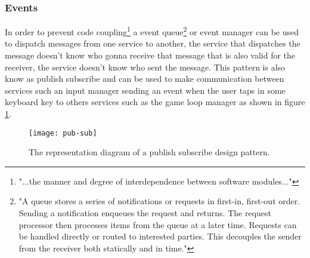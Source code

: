 \subsubsection{Events} \label{sec:events}
In order to prevent code coupling\footnote{"...the manner and degree of interdependence between software modules..."\cite{SystemsAndSoftwareEngineeringVocabulary}} a event queue\footnote{"A queue stores a series of notifications or requests in first-in, first-out order. Sending a notification enqueues the request and returns. The request processor then processes items from the queue at a later time. Requests can be handled directly or routed to interested parties. This decouples the sender from the receiver both statically and in time."\cite{GameProgrammingPatterns}} or event manager can be used to dispatch messages from one service to another, the service that dispatches the message doesn't know who gonna receive that message that is also valid for the receiver, the service doesn't know who sent the message. This pattern is also know as publish subscribe and can be used to make communication between services such an input manager sending an event when the user taps in some keyboard key to others services such as the game loop manager\cite{GameProgrammingPatterns, ZenjectSignals, GangOfFour} as shown in figure \ref{fig:pub-sub}.

\begin{figure}[!h] \centering \texttt{[image: pub-sub]} \caption{The representation diagram of a publish subscribe design pattern\cite{pub-sub}.} \label{fig:pub-sub} \end{figure}